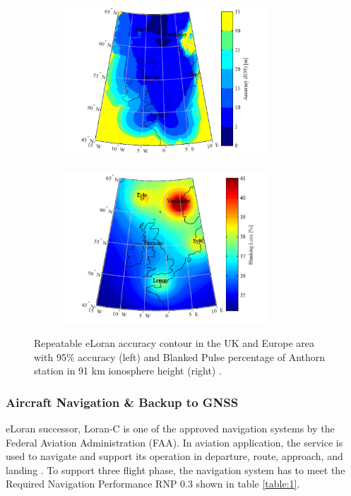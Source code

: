 \begin{figure}[!ht]
\centering
%    
  \begin{subfigure}[b]{0.4\textwidth}
    \includegraphics[height=5.7cm]{Figures/ELORAN_maritime_contour_UK.PNG}
  \end{subfigure}
%
  \begin{subfigure}[b]{0.5\textwidth}
    \includegraphics[height=5.7cm]{Figures/ELORAN_blanking_percentage.PNG}
  \end{subfigure}
%  
  \caption{Repeatable eLoran accuracy contour in the UK and Europe area with 95\% accuracy (left) and Blanked Pulse percentage of Anthorn station in 91 km ionosphere height (right) \cite{SafarAIONS}.}
    \label{fig:eloranblanked}
\end{figure}




\subsubsection{Aircraft Navigation \& Backup to GNSS}
eLoran successor, Loran-C is one of the approved navigation systems by the Federal Aviation Administration (FAA). In aviation application, the service is used to navigate and support its operation in departure, route, approach, and landing \cite{InternationalLORANAssociation2007EnhancedApril}\cite{BartoneH-fieldApplications}. To support three flight phase, the navigation system has to meet the Required Navigation Performance RNP 0.3 shown in table \ref{table:1}.\\

